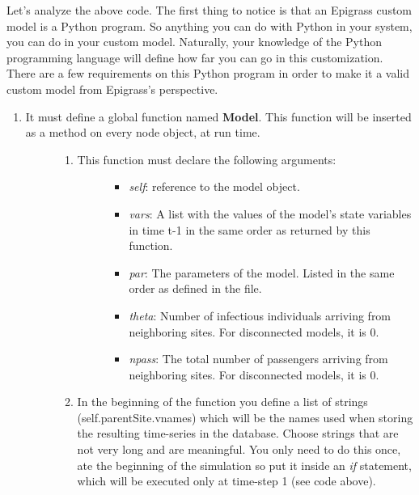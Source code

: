 \documentclass[a4paper,10pt]{manual}
\begin{document}
Let's analyze the above code. The first thing to notice is that an Epigrass custom model is a Python program. So anything you can do with Python in your system, you can do in your custom model. Naturally, your knowledge of the Python programming language will define how far you can go in this customization. There are a few requirements on this Python program in order to make it a valid custom model from Epigrass's perspective.
\begin{enumerate}
\item {} \begin{description}
\item[It must define a global function named \textbf{Model}. This function will be inserted as a method on every node object, at run time.]\begin{enumerate}
\item {} \begin{description}
\item[This function must declare the following arguments:]\begin{itemize}
\item {} 
\emph{self}: reference to the model object.

\item {} 
\emph{vars}: A list with the values of the model's state variables in time t-1 in the same order as returned by this function.

\item {} 
\emph{par}: The parameters of the model. Listed in the same order as defined in the  file.

\item {} 
\emph{theta}: Number of infectious individuals arriving from neighboring sites. For disconnected models, it is 0.

\item {} 
\emph{npass}: The total number of passengers arriving from neighboring sites. For disconnected models, it is 0.

\end{itemize}

\end{description}

\item {} 
In the beginning of the function you define a list of strings (self.parentSite.vnames) which will be the names used when storing the resulting time-series in the database. Choose strings that are not very long and are meaningful. You only need to do this once, ate the beginning of the simulation so put it inside an \emph{if} statement, which will be executed only at time-step 1 (see code above).


\end{enumerate}
\end{description}
\end{enumerate}
\end{document}
